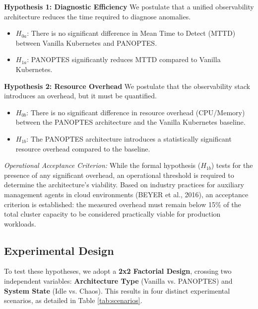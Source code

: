 \textbf{Hypothesis 1: Diagnostic Efficiency}
We postulate that a unified observability architecture reduces the time required to diagnose anomalies.
\begin{itemize}
    \item $H_{0a}$: There is no significant difference in Mean Time to Detect (MTTD) between Vanilla Kubernetes and PANOPTES.
    \item $H_{1a}$: PANOPTES significantly reduces MTTD compared to Vanilla Kubernetes.
\end{itemize}

\textbf{Hypothesis 2: Resource Overhead}
We postulate that the observability stack introduces an overhead, but it must be quantified.
\begin{itemize}
    \item $H_{0b}$: There is no significant difference in resource overhead (CPU/Memory) between the PANOPTES architecture and the Vanilla Kubernetes baseline.
    \item $H_{1b}$: The PANOPTES architecture introduces a statistically significant resource overhead compared to the baseline.
\end{itemize}

\textit{Operational Acceptance Criterion:} While the formal hypothesis ($H_{1b}$) tests for the presence of any significant overhead, an operational threshold is required to determine the architecture's viability. Based on industry practices for auxiliary management agents in cloud environments (BEYER et al., 2016), an acceptance criterion is established: the measured overhead must remain below 15\% of the total cluster capacity to be considered practically viable for production workloads.
\subsection{Experimental Design}
\label{sec:experimental-design}

To test these hypotheses, we adopt a \textbf{2x2 Factorial Design}, crossing two independent variables: \textbf{Architecture Type} (Vanilla vs. PANOPTES) and \textbf{System State} (Idle vs. Chaos). This results in four distinct experimental scenarios, as detailed in Table \ref{tab:scenarios}.



